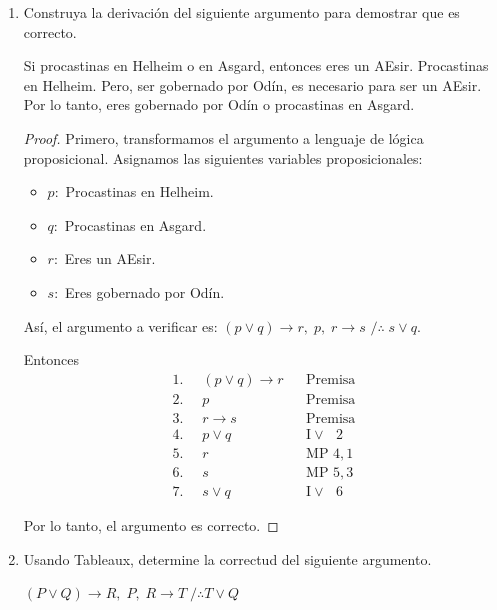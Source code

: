 \documentclass[letterpaper,11pt]{article}
\begin{document}
\begin{enumerate}
    \item Construya la derivación del siguiente argumento para demostrar que es 
    correcto.

    Si procastinas en Helheim o en Asgard, entonces eres un AEsir. Procastinas 
    en Helheim. Pero, ser gobernado por Odín, es necesario para ser un AEsir. 
    Por lo tanto, eres gobernado por Odín o procastinas en Asgard.

    \begin{proof}
        Primero, transformamos el argumento a lenguaje de lógica proposicional.
        Asignamos las siguientes variables proposicionales:

        \begin{itemize}
            \item $p:$ Procastinas en Helheim.
            \item $q:$ Procastinas en Asgard.
            \item $r:$ Eres un AEsir.
            \item $s:$ Eres gobernado por Odín.
        \end{itemize}

        Así, el argumento a verificar es: $(p \lor q) → r, \; p, \; r → s$
        $/∴ \; s \lor q$. 

        Entonces
        \begin{align*}
            1.& \; \; (p \lor q) → r
            && \text{Premisa} \\ 
            2.& \; \; p
            && \text{Premisa} \\
            3.& \; \; r → s
            && \text{Premisa} \\ 
            4.& \; \; p \lor q
            && \text{I$\lor$ $2$} \\ 
            5.& \; \; r
            && \text{MP $4, 1$} \\ 
            6.& \; \; s
            && \text{MP $5, 3$} \\ 
            7.& \; \; s \lor q
            && \text{I$\lor$ $6$}
        \end{align*}

        Por lo tanto, el argumento es correcto.
    \end{proof}

    \item Usando Tableaux, determine la correctud del siguiente argumento.

    \begin{center}
        $(P \lor Q) → R, \; P, \; R → T \; /∴ T \lor Q$
    \end{center}


\end{enumerate}
\end{document}
